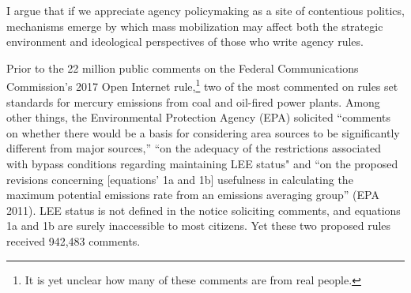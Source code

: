 


































I argue that if we appreciate agency policymaking as a site of contentious politics, mechanisms emerge by which mass mobilization may affect both the strategic environment and ideological perspectives of those who write agency rules. %




Prior to the 22 million public comments on the Federal Communications Commission's 2017 Open Internet rule,\footnote{It is yet unclear how many of these comments are from real people.} two of the most commented on rules set standards for mercury emissions from coal and oil-fired power plants. Among other things, the Environmental Protection Agency (EPA) solicited ``comments on whether there would be a basis for considering area sources to be significantly different from major sources,'' ``on the adequacy of the restrictions associated with bypass conditions regarding maintaining LEE status" and ``on the proposed revisions concerning [equations' 1a and 1b] usefulness in calculating the maximum potential emissions rate from an emissions averaging group'' (EPA 2011). LEE status is not defined in the notice soliciting comments, and equations 1a and 1b are surely inaccessible to most citizens. Yet these two proposed rules received 942,483 comments. 

